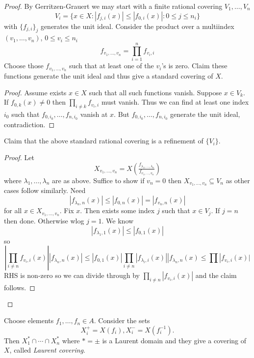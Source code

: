 \documentclass[a4paper]{article}
\begin{document}
\begin{proof}
  By Gerritzen-Grauert we may start with a finite rational covering \(V_1, \dots, V_n\)
  \[
    V_i = \{x \in X: |f_{j, i}(x)| \leq |f_{0, i}(x)|: 0 \leq j \leq n_i\}
  \]
  with \(\{f_{j, i}\}_j\) generates the unit ideal. Consider the product over a multiindex \((v_1, \dots, v_n)\), \(0 \leq v_i \leq n_i\)
  \[
    f_{v_1, \dots, v_n} = \prod_{i = 1}^n f_{v_i, i}
  \]
  Choose those \(f_{v_1, \dots, v_n}\) such that at least one of the \(v_i\)'s is zero. Claim these functions generate the unit ideal and thus give a standard covering of \(X\).

  \begin{proof}
    Assume exists \(x \in X\) such that all such functions vanish. Suppose \(x \in V_k\). If \(f_{0, k}(x) \ne 0\) then \(\prod_{i \ne k} f_{v_i, i}\) must vanish. Thus we can find at least one index \(i_0\) such that \(f_{0, i_0}, \dots, f_{n, i_0}\) vanish at \(x\). But \(f_{0, i_0}, \dots, f_{n, i_0}\) generate the unit ideal, contradiction.
  \end{proof}

  Claim that the above standard rational covering is a refinement of \(\{V_i\}\).

  \begin{proof}
    Let
    \[
      X_{v_1, \dots, v_n} = X(\tfrac{f_{\lambda_1, \dots, \lambda_n}}{f_{v_1, \dots, v_n}})
    \]
    where \(\lambda_1, \dots, \lambda_n\) are as above. Suffice to show if \(v_n = 0\) then \(X_{v_1, \dots, v_n} \subseteq V_n\) as other cases follow similarly. Need
    \[
      |f_{\lambda_n, n}(x)| \leq |f_{0, n}(x)| = |f_{v_n, n}(x)|
    \]
    for all \(x \in X_{v_1, \dots, v_n}\). Fix \(x\). Then exists some index \(j\) such that \(x \in V_j\). If \(j = n\) then done. Otherwise wlog \(j = 1\). We know
    \[
      |f_{\lambda_1, 1}(x)| \leq |f_{0, 1}(x)|
    \]
    so
    \[
      |\prod_{i \ne n} f_{v_i, i}(x)| |f_{\lambda_n, n}(x)|
      \leq |f_{0, 1}(x)| \prod_{i \ne n} |f_{\lambda_i, i}(x)| |f_{\lambda_n, n}(x)
      \leq \prod |f_{v_i, i}(x)|
    \]
    RHS is non-zero so we can divide through by \(\prod_{i \ne n} |f_{v_i, i}(x)|\) and the claim follows.
  \end{proof}
\end{proof}

Choose elements \(f_1, \dots, f_n \in A\). Consider the sets
\[
  X_i^+ = X(f_i), X_i^- = X(f_i^{-1}).
\]
Then \(X_1^* \cap \cdots \cap X_n^*\) where \(* = \pm\) is a Laurent domain and they give a covering of \(X\), called \emph{Laurent covering}.
\end{document}
